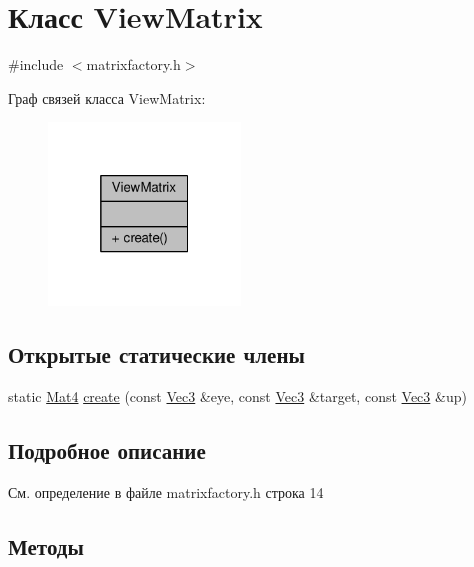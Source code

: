 \hypertarget{class_view_matrix}{}\section{Класс View\+Matrix}
\label{class_view_matrix}


{\ttfamily \#include $<$matrixfactory.\+h$>$}



Граф связей класса View\+Matrix\+:
\nopagebreak
\begin{figure}[H]
\begin{center}
\leavevmode
\includegraphics[width=145pt]{d4/db7/class_view_matrix__coll__graph}
\end{center}
\end{figure}
\subsection*{Открытые статические члены}
\begin{DoxyCompactItemize}
\item 
static \hyperlink{matrix_8h_a077dce9756976f552e5703c34475d5e3}{Mat4} \hyperlink{class_view_matrix_ad8f81cdb7577b980e7c31dd258320db3}{create} (const \hyperlink{vec3_8h_a221ad8ea4d9be4111628ee1ca22ee3ba}{Vec3} \&eye, const \hyperlink{vec3_8h_a221ad8ea4d9be4111628ee1ca22ee3ba}{Vec3} \&target, const \hyperlink{vec3_8h_a221ad8ea4d9be4111628ee1ca22ee3ba}{Vec3} \&up)
\end{DoxyCompactItemize}


\subsection{Подробное описание}


См. определение в файле matrixfactory.\+h строка 14



\subsection{Методы}
